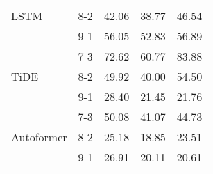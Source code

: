 \begin{table}[h!]
\begin{tabular}{|l|c|c|c|c|}
    \rowcolor{white} LSTM & 8-2 & 42.06 & 38.77 & 46.54 \\ 
    \rowcolor{white}  & 9-1 & 56.05 & 52.83 & 56.89 \\ \hline
    \rowcolor{white!30} & 7-3 & 72.62 & 60.77 & 83.88 \\ 
    \rowcolor{white!30} TiDE & 8-2 & 49.92 & 40.00 & 54.50 \\ 
    \rowcolor{white!30} & 9-1 & 28.40 & 21.45 & 21.76 \\ \hline
    \rowcolor{white}  & 7-3 & 50.08 & 41.07 & 44.73 \\ 
    \rowcolor{white} Autoformer & 8-2 & 25.18 & 18.85 & 23.51 \\ 
    \rowcolor{white}  & 9-1 & 26.91 & 20.11 & 20.61 \\ \hline

    \end{tabular}
\end{table}